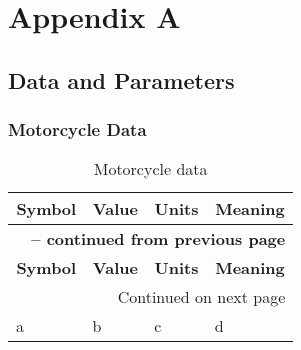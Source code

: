 \appendix
%
\chapter*{Appendix A}
%
\section*{Data and Parameters}
%
\subsection*{Motorcycle Data}
%


    
    
    
    
\begin{longtable}{llll}
    \caption{Motorcycle data} \label{tab:MotoData} \\
    \hline \multicolumn{1}{c}{\textbf{Symbol}} & \multicolumn{1}{c}{\textbf{Value}} & \multicolumn{1}{c}{\textbf{Units}} & \multicolumn{1}{c}{\textbf{Meaning}} \\ \hline
    \endfirsthead

    \multicolumn{4}{c}{{\bfseries \tablename\ \thetable{} -- continued from previous page}} \\
    \hline \multicolumn{1}{c}{\textbf{Symbol}} & \multicolumn{1}{c}{\textbf{Value}} & \multicolumn{1}{c}{\textbf{Units}} & \multicolumn{1}{c}{\textbf{Meaning}} \\ \hline
    \endhead

    \hline \multicolumn{4}{r}{{Continued on next page}} \\ \hline
    \endfoot

    \hline \hline
    \endlastfoot

    a & b & c & d \\

\end{longtable}   

